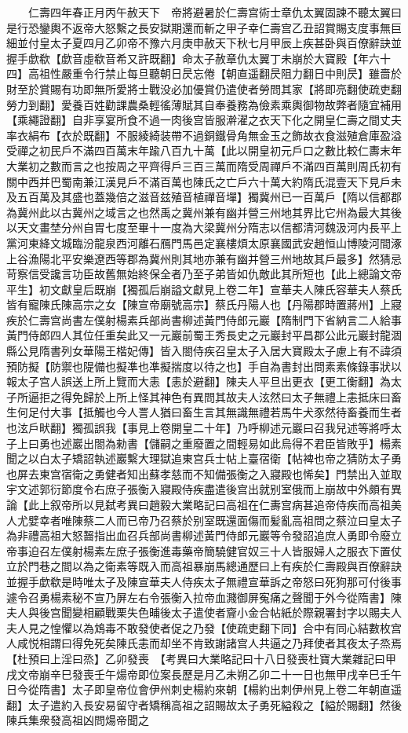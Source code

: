 　　仁壽四年春正月丙午赦天下　帝將避暑於仁壽宫術士章仇太翼固諫不聽太翼曰是行恐鑾輿不返帝大怒繫之長安獄期還而斬之甲子幸仁壽宫乙丑詔賞賜支度事無巨細並付皇太子夏四月乙卯帝不豫六月庚申赦天下秋七月甲辰上疾甚卧與百僚辭訣並握手歔欷【歔音虛欷音希又許既翻】命太子赦章仇太翼丁未崩於大寶殿【年六十四】高祖性嚴重令行禁止每旦聽朝日昃忘倦【朝直遥翻昃阻力翻日中則昃】雖嗇於財至於賞賜有功即無所愛將士戰没必加優賞仍遣使者勞問其家【將即亮翻使疏吏翻勞力到翻】愛養百姓勸課農桑輕徭薄賦其自奉養務為儉素乘輿御物故弊者隨宜補用【乘繩證翻】自非享宴所食不過一肉後宫皆服澣濯之衣天下化之開皇仁壽之間丈夫率衣絹布【衣於既翻】不服綾綺装帶不過銅鐵骨角無金玉之飾故衣食滋殖倉庫盈溢受禪之初民戶不滿四百萬末年踰八百九十萬【此以開皇初元戶口之數比較仁夀末年大業初之數而言之也按周之平齊得戶三百三萬而隋受周禪戶不滿四百萬則周氏初有關中西并巴蜀南兼江漢見戶不滿百萬也陳氏之亡戶六十萬大約隋氏混壹天下見戶未及五百萬及其盛也蓋幾倍之滋音兹殖音植禪音墠】獨冀州已一百萬戶【隋以信都郡為冀州此以古冀州之域言之也然禹之冀州兼有幽并營三州地其界比它州為最大其後以天文畫埜分州自胃七度至畢十一度為大梁冀州分隋志以信都清河魏汲河内長平上黨河東絳文城臨汾龍泉西河離石鴈門馬邑定襄樓煩太原襄國武安趙恒山博陵河間涿上谷漁陽北平安樂遼西等郡為冀州則其地亦兼有幽并營三州地故其戶最多】然猜忌苛察信受讒言功臣故舊無始終保全者乃至子弟皆如仇敵此其所短也【此上總論文帝平生】初文獻皇后既崩【獨孤后崩謚文獻見上卷二年】宣華夫人陳氏容華夫人蔡氏皆有寵陳氏陳高宗之女【陳宣帝廟號高宗】蔡氏丹陽人也【丹陽郡時置蔣州】上寢疾於仁壽宫尚書左僕射楊素兵部尚書柳述黃門侍郎元巖【隋制門下省納言二人給事黃門侍郎四人其位任重矣此又一元巖前蜀王秀長史之元巖封平昌郡公此元巖封龍涸縣公見隋書列女華陽王楷妃傳】皆入閤侍疾召皇太子入居大寶殿太子慮上有不諱須預防擬【防禦也隄備也擬凖也凖擬揣度以待之也】手自為書封出問素素條錄事狀以報太子宫人誤送上所上覽而大恚【恚於避翻】陳夫人平旦出更衣【更工衡翻】為太子所逼拒之得免歸於上所上怪其神色有異問其故夫人泫然曰太子無禮上恚抵床曰畜生何足付大事【抵觸也今人詈人猶曰畜生言其無識無禮若馬牛犬豕然待畜養而生者也泫戶畎翻】獨孤誤我【事見上卷開皇二十年】乃呼柳述元巖曰召我兒述等將呼太子上曰勇也述巖出閤為勑書【儲嗣之重廢置之間輕易如此烏得不君臣皆敗乎】楊素聞之以白太子矯詔執述巖繫大理獄追東宫兵士帖上臺宿衛【帖裨也帝之猜防太子勇也屏去東宫宿衛之勇健者知出蘇孝慈而不知備張衡之入寢殿也悕矣】門禁出入並取宇文述郭衍節度令右庶子張衡入寢殿侍疾盡遣後宫出就别室俄而上崩故中外頗有異論【此上叙帝所以見弑考異曰趙毅大業略記曰高祖在仁夀宫病甚追帝侍疾而高祖美人尤嬖幸者唯陳蔡二人而已帝乃召蔡於别室既還面傷而髪亂高祖問之蔡泣曰皇太子為非禮高祖大怒齧指出血召兵部尚書柳述黃門侍郎元巖等令發詔追庶人勇即令廢立帝事迫召左僕射楊素左庶子張衡進毒藥帝簡驍健官奴三十人皆服婦人之服衣下置仗立於門巷之間以為之衛素等既入而高祖暴崩馬總通歷曰上有疾於仁壽殿與百僚辭訣並握手歔欷是時唯太子及陳宣華夫人侍疾太子無禮宣華訴之帝怒曰死狗那可付後事遽令召勇楊素秘不宣乃屏左右令張衡入拉帝血濺御屏寃痛之聲聞于外今從隋書】陳夫人與後宫聞變相顧戰栗失色晡後太子遣使者齎小金合帖紙於際親署封字以賜夫人夫人見之惶懼以為鴆毒不敢發使者促之乃發【使疏吏翻下同】合中有同心結數枚宫人咸悦相謂曰得免死矣陳氏恚而却坐不肯致謝諸宫人共逼之乃拜使者其夜太子烝焉【杜預曰上淫曰烝】乙卯發喪　【考異曰大業略記曰十八日發喪杜寶大業雜記曰甲戌文帝崩辛巳發喪壬午煬帝即位案長歷是月乙未朔乙卯二十一日也無甲戌辛巳壬午日今從隋書】太子即皇帝位會伊州刺史楊約來朝【楊約出刺伊州見上卷二年朝直遥翻】太子遣約入長安易留守者矯稱高祖之詔賜故太子勇死縊殺之【縊於賜翻】然後陳兵集衆發高祖凶問煬帝聞之